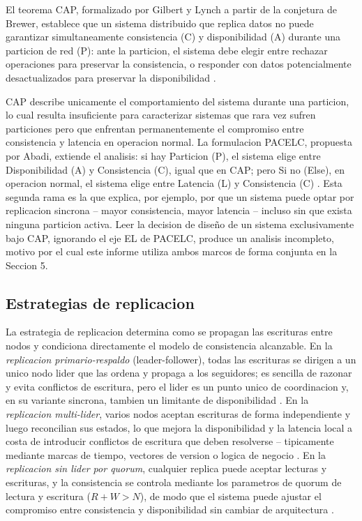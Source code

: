 \documentclass[11pt,a4paper]{article}
\begin{document}
El teorema CAP, formalizado por Gilbert y Lynch a partir de la conjetura de Brewer, establece que un sistema distribuido que replica datos no puede garantizar simultaneamente consistencia (C) y disponibilidad (A) durante una particion de red (P): ante la particion, el sistema debe elegir entre rechazar operaciones para preservar la consistencia, o responder con datos potencialmente desactualizados para preservar la disponibilidad \cite{gilbert2002}.

CAP describe unicamente el comportamiento del sistema durante una particion, lo cual resulta insuficiente para caracterizar sistemas que rara vez sufren particiones pero que enfrentan permanentemente el compromiso entre consistencia y latencia en operacion normal. La formulacion PACELC, propuesta por Abadi, extiende el analisis: si hay Particion (P), el sistema elige entre Disponibilidad (A) y Consistencia (C), igual que en CAP; pero Si no (Else), en operacion normal, el sistema elige entre Latencia (L) y Consistencia (C) \cite{abadi2012}. Esta segunda rama es la que explica, por ejemplo, por que un sistema puede optar por replicacion sincrona -- mayor consistencia, mayor latencia -- incluso sin que exista ninguna particion activa. Leer la decision de diseño de un sistema exclusivamente bajo CAP, ignorando el eje EL de PACELC, produce un analisis incompleto, motivo por el cual este informe utiliza ambos marcos de forma conjunta en la Seccion 5.

\subsection{Estrategias de replicacion}

La estrategia de replicacion determina como se propagan las escrituras entre nodos y condiciona directamente el modelo de consistencia alcanzable. En la \emph{replicacion primario-respaldo} (leader-follower), todas las escrituras se dirigen a un unico nodo lider que las ordena y propaga a los seguidores; es sencilla de razonar y evita conflictos de escritura, pero el lider es un punto unico de coordinacion y, en su variante sincrona, tambien un limitante de disponibilidad \cite{vansteen2017}. En la \emph{replicacion multi-lider}, varios nodos aceptan escrituras de forma independiente y luego reconcilian sus estados, lo que mejora la disponibilidad y la latencia local a costa de introducir conflictos de escritura que deben resolverse -- tipicamente mediante marcas de tiempo, vectores de version o logica de negocio \cite{vansteen2017}. En la \emph{replicacion sin lider por quorum}, cualquier replica puede aceptar lecturas y escrituras, y la consistencia se controla mediante los parametros de quorum de lectura y escritura ($R + W > N$), de modo que el sistema puede ajustar el compromiso entre consistencia y disponibilidad sin cambiar de arquitectura \cite{vansteen2017}.
\end{document}
